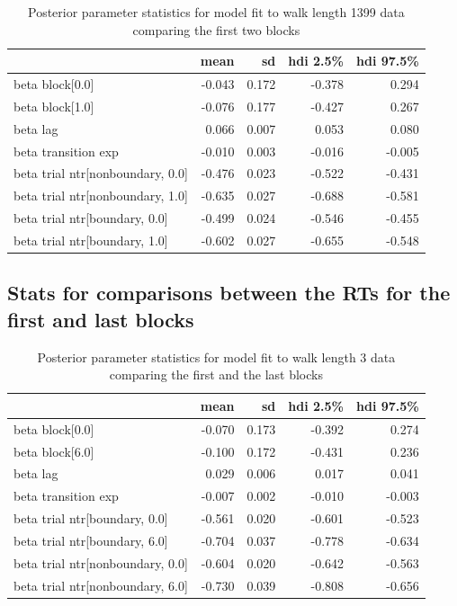 \begin{table}[H]
    \centering
    \begin{tabular}{lrrrr}
        \toprule
         & mean & sd & hdi 2.5\% & hdi 97.5\% \\
        \midrule
        beta block[0.0] & -0.043 & 0.172 & -0.378 & 0.294 \\
        beta block[1.0] & -0.076 & 0.177 & -0.427 & 0.267 \\
        beta lag & 0.066 & 0.007 & 0.053 & 0.080 \\
        beta transition exp & -0.010 & 0.003 & -0.016 & -0.005 \\
        beta trial ntr[nonboundary, 0.0] & -0.476 & 0.023 & -0.522 & -0.431 \\
        beta trial ntr[nonboundary, 1.0] & -0.635 & 0.027 & -0.688 & -0.581 \\
        beta trial ntr[boundary, 0.0] & -0.499 & 0.024 & -0.546 & -0.455 \\
        beta trial ntr[boundary, 1.0] & -0.602 & 0.027 & -0.655 & -0.548 \\
        \bottomrule
        \end{tabular}   
        \caption{Posterior parameter statistics for model fit to walk length 1399 data comparing the first two blocks}
        \label{tab:first-two-blocks-1399}    
\end{table}

\subsection*{Stats for comparisons between the RTs for the first and last blocks}

\begin{table}[H]
    \centering
    \begin{tabular}{lrrrr}
        \toprule
         & mean & sd & hdi 2.5\% & hdi 97.5\% \\
        \midrule
        beta block[0.0] & -0.070 & 0.173 & -0.392 & 0.274 \\
        beta block[6.0] & -0.100 & 0.172 & -0.431 & 0.236 \\
        beta lag & 0.029 & 0.006 & 0.017 & 0.041 \\
        beta transition exp & -0.007 & 0.002 & -0.010 & -0.003 \\
        beta trial ntr[boundary, 0.0] & -0.561 & 0.020 & -0.601 & -0.523 \\
        beta trial ntr[boundary, 6.0] & -0.704 & 0.037 & -0.778 & -0.634 \\
        beta trial ntr[nonboundary, 0.0] & -0.604 & 0.020 & -0.642 & -0.563 \\
        beta trial ntr[nonboundary, 6.0] & -0.730 & 0.039 & -0.808 & -0.656 \\
        \bottomrule
    \end{tabular}        
    \caption{Posterior parameter statistics for model fit to walk length 3 data comparing the first and the last blocks}
    \label{tab:first-last-blocks-3}    
\end{table}

